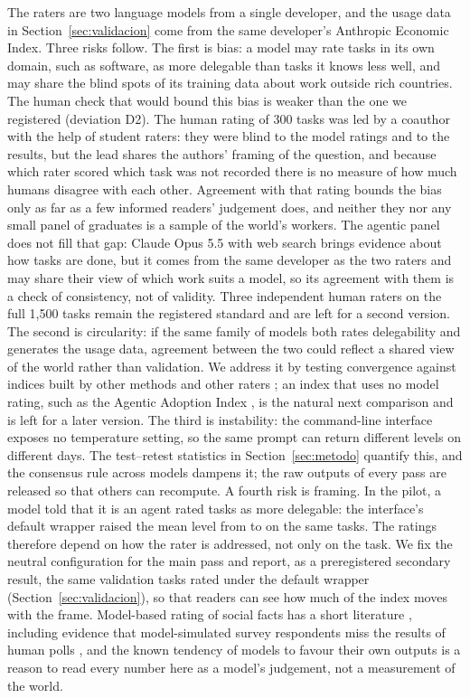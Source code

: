 The raters are two language models from a single developer, and the usage data in Section~\ref{sec:validacion} come from the same developer's Anthropic Economic Index.
Three risks follow.
The first is bias: a model may rate tasks in its own domain, such as software, as more delegable than tasks it knows less well, and may share the blind spots of its training data about work outside rich countries.
The human check that would bound this bias is weaker than the one we registered (deviation D2).
The human rating of 300 tasks was led by a coauthor with the help of student raters: they were blind to the model ratings and to the results, but the lead shares the authors' framing of the question, and because which rater scored which task was not recorded there is no measure of how much humans disagree with each other.
Agreement with that rating bounds the bias only as far as a few informed readers' judgement does, and neither they nor any small panel of graduates is a sample of the world's workers.
The agentic panel does not fill that gap: Claude Opus 5.5 with web search brings evidence about how tasks are done, but it comes from the same developer as the two raters and may share their view of which work suits a model, so its agreement with them is a check of consistency, not of validity.
Three independent human raters on the full 1,500 tasks remain the registered standard and are left for a second version.
The second is circularity: if the same family of models both rates delegability and generates the usage data, agreement between the two could reflect a shared view of the world rather than validation.
We address it by testing convergence against indices built by other methods and other raters \citep{eloundou2024gpts, felten2021occupational, webb2020impact}; an index that uses no model rating, such as the Agentic Adoption Index \citep{lee2026delegates}, is the natural next comparison and is left for a later version.
The third is instability: the command-line interface exposes no temperature setting, so the same prompt can return different levels on different days.
The test--retest statistics in Section~\ref{sec:metodo} quantify this, and the consensus rule across models dampens it; the raw outputs of every pass are released so that others can recompute.
A fourth risk is framing.
In the pilot, a model told that it is an agent rated tasks as more delegable: the interface's default wrapper raised the mean level from  to  on the same tasks.
The ratings therefore depend on how the rater is addressed, not only on the task.
We fix the neutral configuration for the main pass and report, as a preregistered secondary result, the same validation tasks rated under the default wrapper (Section~\ref{sec:validacion}), so that readers can see how much of the index moves with the frame.
Model-based rating of social facts has a short literature \citep{horton2023large, argyle2023out, korinek2023language}, including evidence that model-simulated survey respondents miss the results of human polls \citep{pew2026silicon}, and the known tendency of models to favour their own outputs \citep{zheng2023judging, panickssery2024llm} is a reason to read every number here as a model's judgement, not a measurement of the world.

